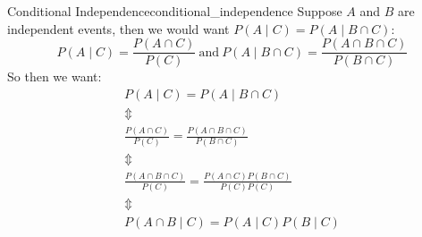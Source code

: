 \begin{definition}{Conditional Independence}{conditional_independence}
Suppose $ A $ and $ B $ are independent events, then we would want $ P\left( A \mid C  \right) =  P\left( A \mid B \cap C  \right)  $:
\[
P\left( A \mid C \right) = \frac{P\left( A \cap C \right) }{P\left( C \right) } ~\text{and}~  P\left( A \mid B \cap  C \right) =  \frac{P\left( A \cap  B \cap  C \right) }{P\left( B \cap  C \right) }
\]
So then we want:
\begin{gather*}
    P\left( A \mid C \right) =  P\left( A \mid B \cap  C \right)  \\
    \Updownarrow \\
\frac{P\left( A \cap C \right) }{P\left( C \right) } =  \frac{P\left( A \cap  B \cap  C \right) }{P\left( B \cap  C \right) }\\
    \Updownarrow \\
    \frac{P\left( A \cap B \cap  C \right) }{P\left( C \right) } =  \frac{P\left( A \cap  C \right) P\left( B \cap  C \right)  }{ P\left( C \right) P\left( C \right)  }\\
    \Updownarrow \\
    P\left( A \cap B \mid C \right)  =  P\left( A \mid C \right) P\left( B \mid C \right) 
\end{gather*}
\end{definition}
